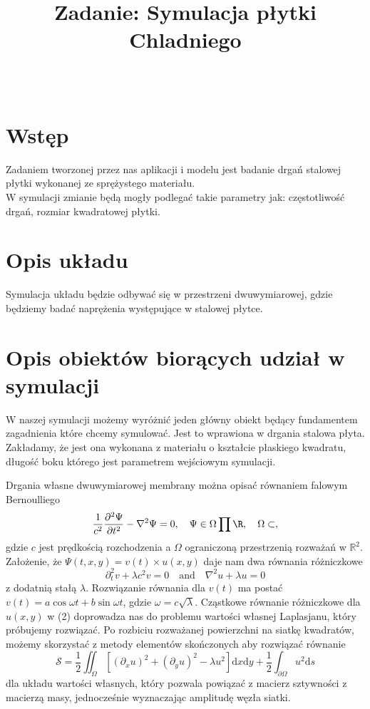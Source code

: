 \documentclass{classrep}
\author{%
  \studentinfo[210347@edu.p.lodz.pl]{Krzysztof Wierzbicki}{210347}\\
  \studentinfo[210209@edu.p.lodz.pl]{Bartosz Jurczewski}{210209}%
}
\title{Zadanie: Symulacja płytki Chladniego }
\begin{document}
\maketitle
\thispagestyle{fancyplain}

\newpage

\section{Wstęp}
Zadaniem tworzonej przez nas aplikacji i modelu jest badanie drgań stalowej płytki wykonanej ze sprężystego materiału. \\
W symulacji zmianie będą mogły podlegać takie parametry jak: częstotliwość drgań, rozmiar kwadratowej płytki.

\section{Opis układu}
Symulacja układu będzie odbywać się w przestrzeni dwuwymiarowej, gdzie będziemy badać naprężenia występujące w stalowej płytce. 

\section{Opis obiektów biorących udział w symulacji}
W naszej symulacji możemy wyróżnić jeden główny obiekt będący fundamentem zagadnienia które chcemy symulować. Jest to wprawiona w drgania stalowa płyta. Zakładamy, że jest ona wykonana z materiału o kształcie płaskiego kwadratu, długość boku którego jest parametrem wejściowym symulacji.

Drgania własne dwuwymiarowej membrany można opisać równaniem falowym Bernoulliego
\begin{equation}
\frac{1}{c^2}\frac{\partial^2 \Psi}{\partial t^2}-\nabla ^2 \Psi = 0,\quad
\Psi \in \Omega \prod \R,\quad
\Omega \subset,
\end{equation}
gdzie $c$ jest prędkością rozchodzenia a $\Omega$ ograniczoną przestrzenią rozważań w $\mathbb{R}^2$.
Założenie, że $\Psi(t, x, y) = v(t) \times u(x, y)$ daje nam dwa równania różniczkowe
\begin{equation}
\partial^2_t v+\lambda c^2v=0
\quad \mathrm{and} \quad
\nabla ^2 u +\lambda u=0
\end{equation}
z dodatnią stałą $\lambda$.
Rozwiązanie równania dla $v(t)$ ma postać $v(t)=a \cos{\omega t}+b \sin{\omega t}$, gdzie $\omega=c \sqrt{\lambda}$. Cząstkowe równanie różniczkowe dla $u(x, y)$ w (2) doprowadza nas do problemu wartości własnej Laplasjanu, który próbujemy rozwiązać.
Po rozbiciu rozważanej powierzchni na siatkę kwadratów, możemy skorzystać z metody elementów skończonych aby rozwiązać równanie 
\begin{equation}
\mathcal{S} = \frac{1}{2}\iint_\Omega [(\partial_x u)^2+(\partial_y u)^2-\lambda u^2]\mathrm{d}x\mathrm{d}y+\frac{1}{2}\int_{\partial \Omega} u^2\mathrm{d}s
\end{equation}
dla układu wartości własnych, który pozwala powiązać z macierz sztywności z macierzą masy, jednocześnie wyznaczając
amplitudę węzła siatki. 
\end{document}
